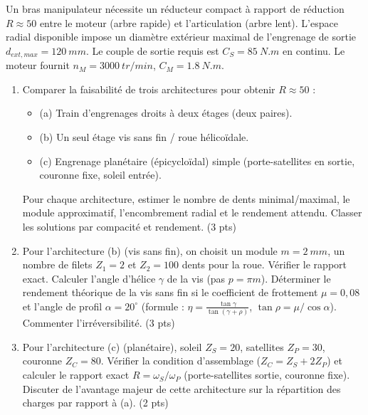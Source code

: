 \documentclass[11pt]{article}
\begin{document}
\begin{exercice}
Un bras manipulateur nécessite un réducteur compact à rapport de réduction $R \approx 50$ entre le moteur (arbre rapide) et l'articulation (arbre lent). L'espace radial disponible impose un diamètre extérieur maximal de l'engrenage de sortie $d_{ext,max} = \SI{120}{mm}$. Le couple de sortie requis est $C_S = \SI{85}{N.m}$ en continu. Le moteur fournit $n_M = \SI{3000}{tr/min}$, $C_M = \SI{1,8}{N.m}$.
\begin{enumerate}
    \item Comparer la faisabilité de trois architectures pour obtenir $R \approx 50$ : 
    \begin{itemize}
        \item (a) Train d'engrenages droits à deux étages (deux paires).
        \item (b) Un seul étage vis sans fin / roue hélicoïdale.
        \item (c) Engrenage planétaire (épicycloïdal) simple (porte-satellites en sortie, couronne fixe, soleil entrée).
    \end{itemize}
    Pour chaque architecture, estimer le nombre de dents minimal/maximal, le module approximatif, l'encombrement radial et le rendement attendu. Classer les solutions par compacité et rendement. (3 pts)
    \item Pour l'architecture (b) (vis sans fin), on choisit un module $m = \SI{2}{mm}$, un nombre de filets $Z_1 = 2$ et $Z_2 = 100$ dents pour la roue. Vérifier le rapport exact. Calculer l'angle d'hélice $\gamma$ de la vis (pas $p = \pi m$). Déterminer le rendement théorique de la vis sans fin si le coefficient de frottement $\mu = 0,08$ et l'angle de profil $\alpha = 20^\circ$ (formule : $\eta = \frac{\tan\gamma}{\tan(\gamma+\rho)}$, $\tan\rho = \mu/\cos\alpha$). Commenter l'irréversibilité. (3 pts)
    \item Pour l'architecture (c) (planétaire), soleil $Z_S = 20$, satellites $Z_P = 30$, couronne $Z_C = 80$. Vérifier la condition d'assemblage ($Z_C = Z_S + 2Z_P$) et calculer le rapport exact $R = \omega_S / \omega_P$ (porte-satellites sortie, couronne fixe). Discuter de l'avantage majeur de cette architecture sur la répartition des charges par rapport à (a). (2 pts)
\end{enumerate}
\end{exercice}
\end{document}
